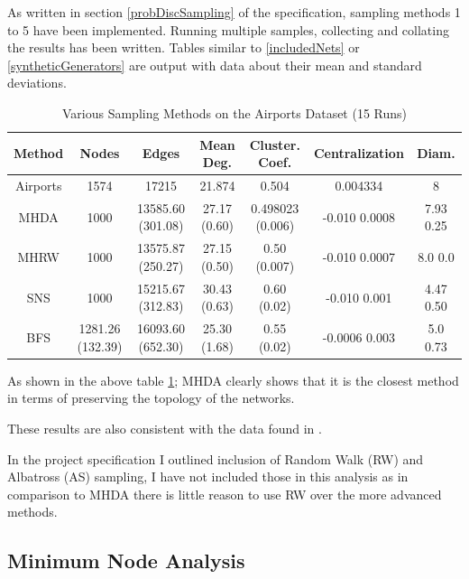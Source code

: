\documentclass{article}
\begin{document}
As written in section \ref{probDiscSampling} of the specification, sampling methods 1 to 5 have been implemented.
Running multiple samples, collecting and collating the results has been written.
Tables similar to \ref{includedNets} or \ref{syntheticGenerators} are output with data about their mean and standard deviations.

\begin{table}[h]
	\centering
	\begin{tabular}{|c|c|c|c|c|c|c|}
		\hline
		\textbf{Method} & \textbf{Nodes}   & \textbf{Edges}     & \textbf{Mean Deg.} & \textbf{Cluster. Coef.} & \textbf{Centralization} & \textbf{Diam.} \\
		\hline
		Airports        & 1574             & 17215              & 21.874             & 0.504                   & 0.004334                & 8              \\
		\hline
		MHDA            & 1000             & 13585.60	 (301.08) & 27.17 (0.60)       & 0.498023 (0.006)        & -0.010 	0.0008          & 7.93 	0.25     \\
		\hline
		MHRW            & 1000             & 13575.87 (250.27)  & 27.15 	  (0.50)    & 0.50	(0.007)            & -0.010   0.0007         & 8.0 	0.0       \\
		\hline
		SNS             & 1000             & 15215.67	(312.83)  & 30.43 	  (0.63)    & 0.60 (0.02)             & -0.010 	0.001           & 4.47 	0.50     \\
		\hline
		BFS             & 1281.26 (132.39) & 16093.60  (652.30) & 25.30 (1.68)       & 0.55	(0.02)             & -0.0006	0.003           & 5.0	0.73       \\
		\hline
	\end{tabular}
	\caption{Various Sampling Methods on the Airports Dataset (15 Runs)}
	\label{enron_sample_methods_compared}
\end{table}

As shown in the above table \ref{enron_sample_methods_compared}; MHDA clearly shows that it is the closest method in terms of preserving the topology of the networks.

These results are also consistent with the data found in \cite{franks2014learning}.

In the project specification I outlined inclusion of Random Walk (RW) and Albatross (AS) sampling, I have not included those in this analysis as in comparison to MHDA there is little reason to use RW over the more advanced methods.

\subsection{Minimum Node Analysis}
\end{document}
